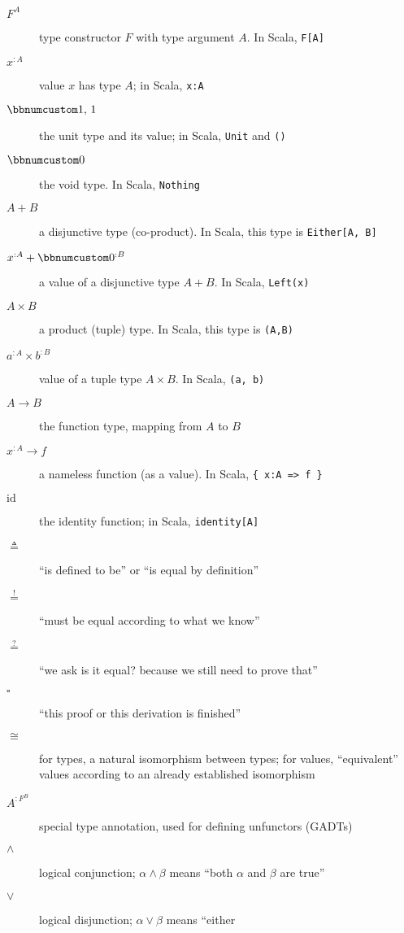 \begin{description}
\item [{$F^{A}$}] type constructor $F$ with type argument $A$. In Scala,
\lstinline!F[A]!
\item [{$x^{:A}$}] value $x$ has type $A$; in Scala, \lstinline!x:A!
\item [{$\bbnum 1,\,1$}] the unit type and its value; in Scala, \lstinline!Unit!
and \lstinline!()!
\item [{$\bbnum 0$}] the void type. In Scala, \lstinline!Nothing!
\item [{$A+B$}] a disjunctive type (co-product). In Scala, this type is
\lstinline!Either[A, B]! 
\item [{$x^{:A}+\bbnum 0^{:B}$}] a value of a disjunctive type $A+B$.
In Scala, \lstinline!Left(x)!
\item [{$A\times B$}] a product (tuple) type. In Scala, this type is \lstinline!(A,B)!
\item [{$a^{:A}\times b^{:B}$}] value of a tuple type $A\times B$. In
Scala, \lstinline!(a, b)!
\item [{$A\rightarrow B$}] the function type, mapping from $A$ to $B$
\item [{$x^{:A}\rightarrow f$}] a nameless function (as a value). In Scala,
\lstinline!{ x:A => f }!
\item [{$\text{id}$}] the identity function; in Scala, \lstinline!identity[A]!
\item [{$\triangleq$}] \textsf{``}is defined to be\textsf{''} or \textsf{``}is equal by definition\textsf{''}
\item [{$\overset{!}{=}$}] \textsf{``}must be equal according to what we know\textsf{''}
\item [{$\overset{?}{=}$}] \textsf{``}we ask \textemdash{} is it equal? \textemdash{}
because we still need to prove that\textsf{''}
\item [{$\square$}] \textsf{``}this proof or this derivation is finished\textsf{''}
\item [{$\cong$}] for types, a natural isomorphism between types; for
values, \textsf{``}equivalent\textsf{''} values according to an already established
isomorphism
\item [{$A^{:F^{B}}$}] special type annotation, used for defining unfunctors
(GADTs)
\item [{$\wedge$}] logical conjunction; $\alpha\wedge\beta$ means \textsf{``}both
$\alpha$ and $\beta$ are true\textsf{''}
\item [{$\vee$}] logical disjunction; $\alpha\vee\beta$ means \textsf{``}either

\end{description}
